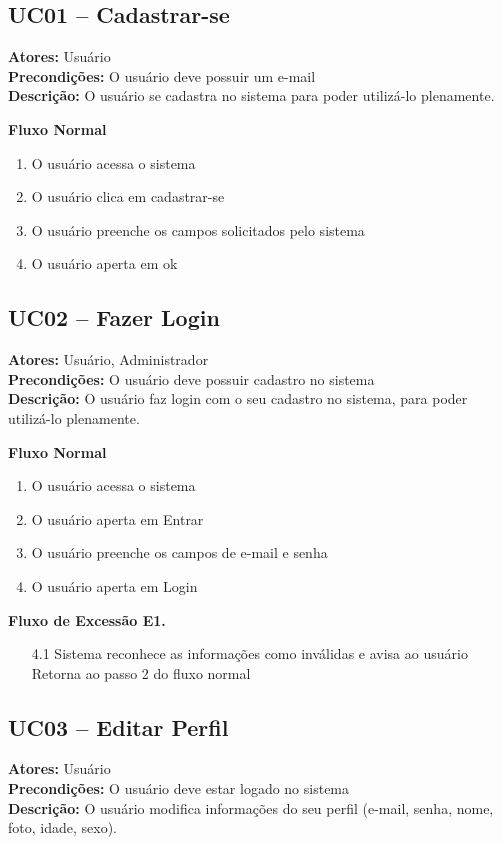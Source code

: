 \documentclass[12pt]{article}
\begin{document}
\subsection{UC01 -- Cadastrar-se}
\textbf{Atores:} Usuário \\
\textbf{Precondições:} O usuário deve possuir um e-mail \\
\textbf{Descrição:} O usuário se cadastra no sistema para poder utilizá-lo plenamente.

\textbf{Fluxo Normal}
\begin{enumerate}
  \item O usuário acessa o sistema
  \item O usuário clica em cadastrar-se
  \item O usuário preenche os campos solicitados pelo sistema
  \item O usuário aperta em ok
\end{enumerate}

\subsection{UC02 -- Fazer Login}
\textbf{Atores:} Usuário, Administrador \\
\textbf{Precondições:} O usuário deve possuir cadastro no sistema \\
\textbf{Descrição:} O usuário faz login com o seu cadastro no sistema, para poder utilizá-lo plenamente.

\textbf{Fluxo Normal}
\begin{enumerate}
  \item O usuário acessa o sistema
  \item O usuário aperta em Entrar
  \item O usuário preenche os campos de e-mail e senha
  \item O usuário aperta em Login

\end{enumerate}


\textbf{Fluxo de Excessão E1.}
\begin{enumerate}
  \item [4.1] Sistema reconhece as informações como inválidas e avisa ao usuário
    Retorna ao passo 2 do fluxo normal
\end{enumerate}

\subsection{UC03 -- Editar Perfil}
\textbf{Atores:} Usuário \\
\textbf{Precondições:} O usuário deve estar logado no sistema \\
\textbf{Descrição:} O usuário modifica informações do seu perfil (e-mail, senha, nome, foto, idade, sexo).
\end{document}
